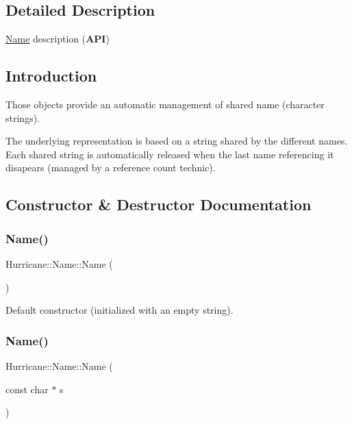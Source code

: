 \subsection{Detailed Description}
\hyperlink{classHurricane_1_1Name}{Name} description ({\bfseries A\+PI}) 

\hypertarget{classHurricane_1_1Name_secNameIntro}{}\subsection{Introduction}\label{classHurricane_1_1Name_secNameIntro}
Those objects provide an automatic management of shared name (character strings).

The underlying representation is based on a string shared by the different names. Each shared string is automatically released when the last name referencing it disapears (managed by a reference count technic). 

\subsection{Constructor \& Destructor Documentation}
\mbox{\label{classHurricane_1_1Name_a42636ecb0d4d7d03eb881420a244038b}} 
\subsubsection{\texorpdfstring{Name()}{Name()}\hspace{0.1cm}{\footnotesize\ttfamily [1/4]}}
{\footnotesize\ttfamily Hurricane\+::\+Name\+::\+Name (\begin{DoxyParamCaption}{ }\end{DoxyParamCaption})}

Default constructor (initialized with an empty string). \mbox{\label{classHurricane_1_1Name_a754d54199d54c5e4568421c89f0682cb}} 
\subsubsection{\texorpdfstring{Name()}{Name()}\hspace{0.1cm}{\footnotesize\ttfamily [2/4]}}
{\footnotesize\ttfamily Hurricane\+::\+Name\+::\+Name (\begin{DoxyParamCaption}\item[{const char $\ast$}]{s }\end{DoxyParamCaption})}

